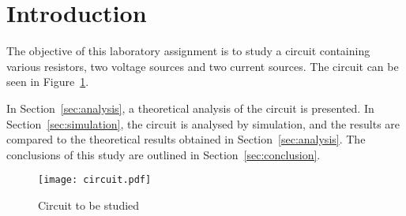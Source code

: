 \section{Introduction}
\label{sec:introduction}

The objective of this laboratory assignment is to study a circuit containing
various resistors, two voltage sources and two current sources. The circuit can be seen in Figure~\ref{fig:circuit}.


In Section~\ref{sec:analysis}, a theoretical analysis of the circuit is
presented. In Section~\ref{sec:simulation}, the circuit is analysed by
simulation, and the results are compared to the theoretical results obtained in
Section~\ref{sec:analysis}. The conclusions of this study are outlined in
Section~\ref{sec:conclusion}.

\begin{figure}[H] \centering
\texttt{[image: circuit.pdf]}
\caption{Circuit to be studied}
\label{fig:circuit}
\end{figure}

